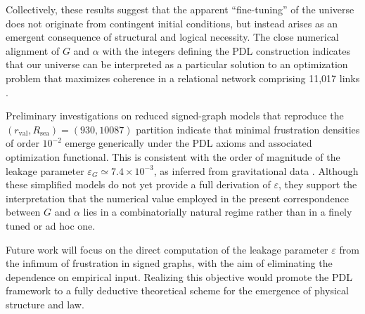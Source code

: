 \documentclass[11pt,a4paper]{article}
\begin{document}
Collectively, these results suggest that the apparent “fine-tuning” of the universe does not originate from contingent initial conditions, but instead arises as an emergent consequence of structural and logical necessity. The close numerical alignment of \(G\) and \(\alpha\) with the integers defining the PDL construction indicates that our universe can be interpreted as a particular solution to an optimization problem that maximizes coherence in a relational network comprising 11,017 links \cite{PDL_Main_2026}.

Preliminary investigations on reduced signed-graph models that reproduce the
\((r_{\text{val}}, R_{\text{sea}}) = (930, 10087)\) partition indicate that
minimal frustration densities of order \(10^{-2}\) emerge generically under the
PDL axioms and associated optimization functional. This is consistent with the
order of magnitude of the leakage parameter
\(\varepsilon_G \simeq 7.4 \times 10^{-3}\),
as inferred from gravitational data \cite{Exponent_18_PDL_2026,Combinatorial_Proton_v2_2026}. Although these simplified models do not yet provide a full derivation of \(\varepsilon\), they support the interpretation that the numerical value employed in the present correspondence between \(G\) and \(\alpha\) lies in a combinatorially natural regime rather than in a finely tuned or ad hoc one.

Future work will focus on the direct computation of the leakage parameter \(\varepsilon\) from the infimum of frustration in signed graphs, with the aim of eliminating the dependence on empirical input. Realizing this objective would promote the PDL framework to a fully deductive theoretical scheme for the emergence of physical structure and law.



\end{document}
